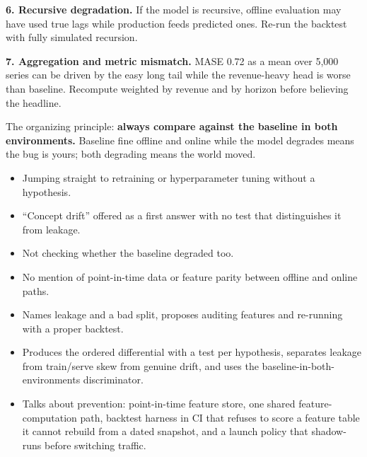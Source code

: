 \begin{interviewq}
\textbf{6. Recursive degradation.} If the model is recursive, offline evaluation may have used true lags while production feeds predicted ones. Re-run the backtest with fully simulated recursion.

\textbf{7. Aggregation and metric mismatch.} MASE 0.72 as a mean over 5{,}000 series can be driven by the easy long tail while the revenue-heavy head is worse than baseline. Recompute weighted by revenue and by horizon before believing the headline.

The organizing principle: \textbf{always compare against the baseline in both environments.} Baseline fine offline and online while the model degrades means the bug is yours; both degrading means the world moved.

\redflags
\begin{itemize}
    \item Jumping straight to retraining or hyperparameter tuning without a hypothesis.
    \item ``Concept drift'' offered as a first answer with no test that distinguishes it from leakage.
    \item Not checking whether the baseline degraded too.
    \item No mention of point-in-time data or feature parity between offline and online paths.
\end{itemize}


\goodgreat
\begin{itemize}
    \item {} Names leakage and a bad split, proposes auditing features and re-running with a proper backtest.
    \item {} Produces the ordered differential with a test per hypothesis, separates leakage from train/serve skew from genuine drift, and uses the baseline-in-both-environments discriminator.
    \item {} Talks about prevention: point-in-time feature store, one shared feature-computation path, backtest harness in CI that refuses to score a feature table it cannot rebuild from a dated snapshot, and a launch policy that shadow-runs before switching traffic.
\end{itemize}

\end{interviewq}

